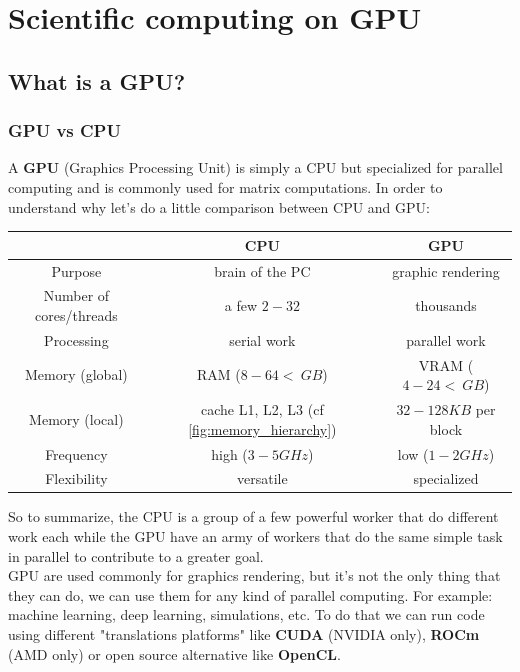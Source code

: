 \documentclass[12pt, openany]{report}
\theoremstyle{definition}
\begin{document}
\chapter{Scientific computing on GPU}
\section{What is a GPU?}
\subsection{GPU vs CPU}
A \textbf{GPU} (Graphics Processing Unit) is simply a CPU but specialized for parallel computing and is commonly used for matrix computations. In order to understand why let's do a little comparison between CPU and GPU:
\begin{center}
	\begin{tabular}{|c|c|c|}
		\hline
		& CPU & GPU \\
		\hline
		Purpose & brain of the PC & graphic rendering \\
		\hline
		Number of cores/threads & a few $2-32$ & thousands \\
		\hline
		Processing & serial work & parallel work \\
		\hline
		Memory (global) & RAM ($8-64< \: GB$) & VRAM ($4-24< \: GB$) \\
		\hline
		Memory (local) & cache L1, L2, L3 (cf \ref{fig:memory_hierarchy}) & $32-128 KB$ per block \\
		\hline
		Frequency & high ($3-5 GHz$) & low ($1-2 GHz$) \\
		\hline
		Flexibility & versatile & specialized \\
		\hline
	\end{tabular}
\end{center}
So to summarize, the CPU is a group of a few powerful worker that do different work each while the GPU have an army of workers that do the same simple task in parallel to contribute to a greater goal.\\
GPU are used commonly for graphics rendering, but it's not the only thing that they can do, we can use them for any kind of parallel computing. For example: machine learning, deep learning, simulations, etc. To do that we can run code using different "translations platforms" like \textbf{CUDA} (NVIDIA only), \textbf{ROCm} (AMD only) or open source alternative like \textbf{OpenCL}.\\
\end{document}
